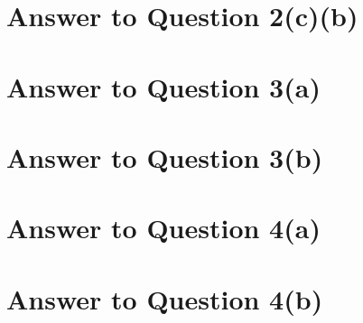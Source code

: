 \documentclass[11pt]{article}
\begin{document}
\section*{Answer to Question 2(c)(b)}

\section*{Answer to Question 3(a)}

\section*{Answer to Question 3(b)}

\section*{Answer to Question 4(a)}

\section*{Answer to Question 4(b)}
\end{document}
